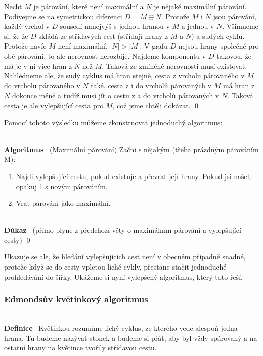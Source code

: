 \documentclass{article}
\renewcommand{\paragraph}[1]{\ \\\smallskip\noindent\textbf{#1}\ }
\begin{document}
Nechť $M$ je párování, které není maximální a $N$ je nějaké maximální párování.  
Podívejme se na symetrickou diferenci $D = M \oplus N$. Protože $M$ i $N$ jsou 
párování, každý vrchol v $D$ sousedí nanejvýš s jednou hranou v $M$ a jednou v 
$N$. Všimneme si, že že $D$ skládá ze střídavých cest (střídají hrany z $M$ a 
$N$) a sudých cyklů. Protože navíc $M$ není maximální, $|N| > |M|$. V grafu $D$ 
nejsou hrany společné pro obě párování, to ale nerovnost nerozbije. Najdeme 
komponentu v $D$ takovou, že má je v ní více hran z $N$ než $M$. Taková ze 
zmíněné nerovnosti musí existovat. Nahlédneme ale, že sudý cyklus má hran 
stejně, cesta z vrcholu párovaného v $M$ do vrcholu párovaného v $N$ také, cesta 
z i do vrcholů párovaných v $M$ má hran z $N$ dokonce méně a tudíž musí jít o 
cestu z a do vrcholů párovaných v $N$. Taková cesta je ale vylepšující cesta pro 
$M$, což jsme chtěli dokázat.
\qed

Pomocí tohoto výsledku můžeme zkonstruovat jednoduchý algoritmus:

\paragraph{Algoritmus} (Maximální párování)
Začni s nějakým (třeba prázdným párováním M):
\begin{enumerate}
	\item Najdi vylepšující cestu, pokud existuje a převrať její hrany. Pokud 
	jsi našel, opakuj 1 s novým párováním.
	\item Vrať párování jako maximální.
\end{enumerate}
\paragraph{Důkaz} (přímo plyne z předchozí věty o maximálním párování a 
vylepšující cesty)
\qed

Ukazuje se ale, že hledání vylepšujících cest není v obecném případně snadné, 
protože když se do cesty vpletou liché cykly, přestane stačit jednoduché 
prohledávání do šířky. Ukážeme si nyní vylepšený algoritmus, který toto řeší.

\subsubsection{Edmondsův květinkový algoritmus}
\paragraph{Definice} Květinkou rozumíme lichý cyklus, ze kterého vede alespoň 
jedna hrana. Tu budeme nazývat stonek a budeme si přát, aby byl vždy spárovaný a 
na ostatní hrany na květince tvořily střídavou cestu.
\end{document}
